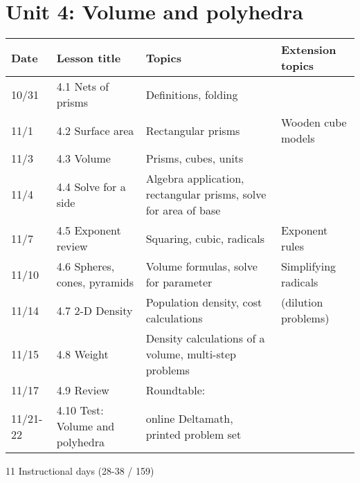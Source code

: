 \documentclass[12pt, twoside]{article}
\begin{document}
\section*{Unit 4: Volume and polyhedra}
\begin{tabular}{|p{0.9cm}|p{4cm}|p{7cm}|p{5cm}|}
  \hline
  Date & Lesson title & Topics  & Extension topics \\
  \hline
  10/31 & 4.1 Nets of prisms & Definitions, folding &  \\
  \hline
  11/1 & 4.2 Surface area & Rectangular prisms & Wooden cube models \\
  \hline
  11/3 & 4.3 Volume & Prisms, cubes, units &  \\
  \hline
  11/4 & 4.4 Solve for a side & Algebra application, rectangular prisms, solve for area of base &  \\
  \hline
  11/7 & 4.5 Exponent review & Squaring, cubic, radicals & Exponent rules \\
  \hline
  11/10 & 4.6 Spheres, cones, pyramids & Volume formulas, solve for parameter & Simplifying radicals \\
  \hline
  11/14 & 4.7 2-D Density & Population density, cost calculations & (dilution problems) \\
  \hline
  11/15 & 4.8 Weight & Density calculations of a volume, multi-step problems & \\
  \hline
  11/17 & 4.9 Review & Roundtable: &  \\
  \hline
  11/21-22 & 4.10 Test: Volume and polyhedra & online Deltamath, printed problem set &  \\
  \hline

\end{tabular} \par \vspace*{0.3cm}
11 Instructional days (28-38 / 159)
\end{document}
